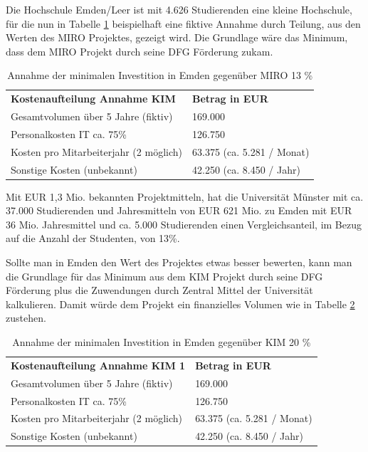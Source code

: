 Die Hochschule Emden/Leer ist mit 4.626 Studierenden eine kleine Hochschule, für die nun in Tabelle \ref{tab_kostenaufteilung_emden_MIRO} beispielhaft eine fiktive Annahme durch Teilung, aus den Werten des MIRO Projektes, gezeigt wird. Die Grundlage wäre das Minimum, dass dem MIRO Projekt durch seine DFG Förderung zukam.

\begin{table}[h!]
	\begin{tabularx}{\textwidth}{l|l}
		\hline
		\textbf{Kostenaufteilung Annahme KIM} & \textbf{Betrag in EUR}\\
		Gesamtvolumen über 5 Jahre (fiktiv) & 169.000\\
		Personalkosten IT ca. 75\% & 126.750\\
		Kosten pro Mitarbeiterjahr (2 möglich) & 63.375 (ca. 5.281 / Monat)\\ 
		Sonstige Kosten (unbekannt) & 42.250 (ca. 8.450 / Jahr)\\
		\hline
	\end{tabularx}
	\caption{Annahme der minimalen Investition in Emden gegenüber MIRO 13 \%}
	\label{tab_kostenaufteilung_emden_MIRO}
\end{table}

\newpage

Mit EUR 1,3 Mio. bekannten Projektmitteln, hat die Universität Münster mit ca. 37.000 Studierenden und Jahresmitteln von EUR 621 Mio. zu Emden mit EUR 36 Mio. Jahresmittel und ca. 5.000 Studierenden einen Vergleichsanteil, im Bezug auf die Anzahl der Studenten, von 13\%.

Sollte man in Emden den Wert des Projektes etwas besser bewerten, kann man die Grundlage für das Minimum aus dem KIM Projekt durch seine DFG Förderung plus die Zuwendungen durch Zentral Mittel der Universität kalkulieren. Damit würde dem Projekt ein finanzielles Volumen wie in Tabelle \ref{tab_kostenaufteilung_emden_KIM1} zustehen.

\begin{table}[h!]
	\begin{tabularx}{\textwidth}{l|l}
		\hline
		\textbf{Kostenaufteilung Annahme KIM 1} & \textbf{Betrag in EUR}\\
		Gesamtvolumen über 5 Jahre (fiktiv) & 169.000\\
		Personalkosten IT ca. 75\% & 126.750\\
		Kosten pro Mitarbeiterjahr (2 möglich) & 63.375 (ca. 5.281 / Monat)\\ 
		Sonstige Kosten (unbekannt) & 42.250 (ca. 8.450 / Jahr)\\
		\hline
	\end{tabularx}
	\caption{Annahme der minimalen Investition in Emden gegenüber KIM 20 \%}
	\label{tab_kostenaufteilung_emden_KIM1}
\end{table}

